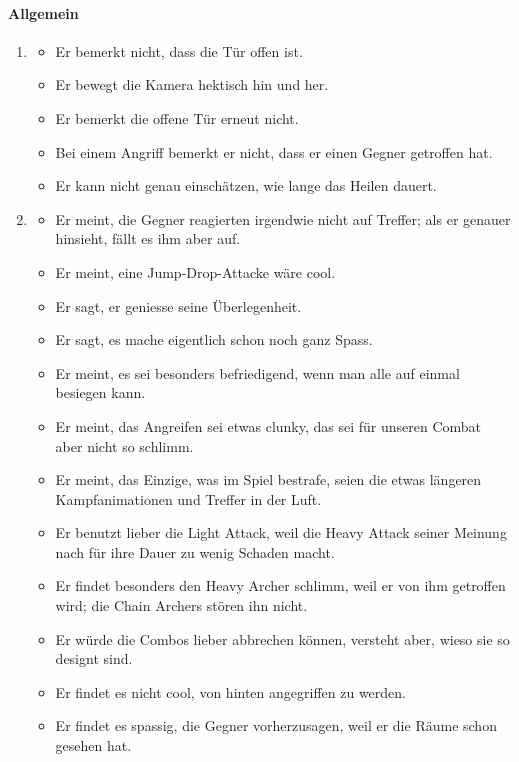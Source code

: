 \documentclass[../Main.tex]{subfiles}
\begin{document}
\paragraph{Allgemein}
\begin{enumerate}[label=\textbf{B\arabic*}, leftmargin=1.5cm, itemsep=0.8em, resume]
\item
\begin{itemize}[nosep]
    \item Er bemerkt nicht, dass die Tür offen ist.
    \item Er bewegt die Kamera hektisch hin und her.
    \item Er bemerkt die offene Tür erneut nicht.
    \item Bei einem Angriff bemerkt er nicht, dass er einen Gegner getroffen hat.
    \item Er kann nicht genau einschätzen, wie lange das Heilen dauert.
\end{itemize}
\item
\begin{itemize}[nosep]
    \item Er meint, die Gegner reagierten irgendwie nicht auf Treffer; als er genauer hinsieht, fällt es ihm aber auf.
    \item Er meint, eine Jump-Drop-Attacke wäre cool.
    \item Er sagt, er geniesse seine Überlegenheit.
    \item Er sagt, es mache eigentlich schon noch ganz Spass.
    \item Er meint, es sei besonders befriedigend, wenn man alle auf einmal besiegen kann.
    \item Er meint, das Angreifen sei etwas clunky, das sei für unseren Combat aber nicht so schlimm.
    \item Er meint, das Einzige, was im Spiel bestrafe, seien die etwas längeren Kampfanimationen und Treffer in der Luft.
    \item Er benutzt lieber die Light Attack, weil die Heavy Attack seiner Meinung nach für ihre Dauer zu wenig Schaden macht.
    \item Er findet besonders den Heavy Archer schlimm, weil er von ihm getroffen wird; die Chain Archers stören ihn nicht.
    \item Er würde die Combos lieber abbrechen können, versteht aber, wieso sie so designt sind.
    \item Er findet es nicht cool, von hinten angegriffen zu werden.
    \item Er findet es spassig, die Gegner vorherzusagen, weil er die Räume schon gesehen hat.

\end{itemize}
\end{enumerate}
\end{document}
